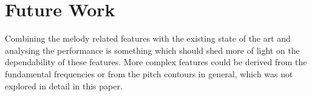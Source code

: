 \documentclass[12pt,journal,compsoc]{IEEEtran}
\begin{document}
\section{Future Work}

Combining the melody related features with the existing state of the art and analysing the performance is something which should shed more of light on the dependability of these features. More complex features could be derived from the fundamental frequencies or from the pitch contours in general, which was not explored in detail in this paper.


\end{document}
